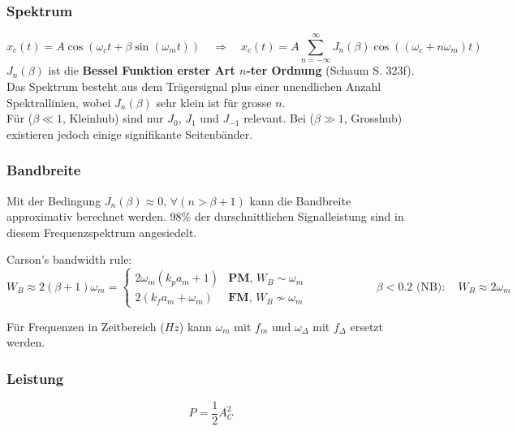 \subsubsection{Spektrum}
$$x_c(t) = A \cos(\omega_c t + \beta \sin(\omega_m t)) \quad \Rightarrow \quad 
x_c(t) = A \sum\limits_{n=-\infty}^{\infty} J_n(\beta) \cos((\omega_c + n \omega_m)t)$$
\textbf{$J_n(\beta)$} ist die \textbf{Bessel Funktion erster Art $n$-ter Ordnung} (Schaum
S. 323f). Das Spektrum besteht aus dem Trägersignal plus einer unendlichen Anzahl Spektrallinien,
wobei $J_n(\beta)$ sehr klein ist für grosse $n$. \\
Für ($\beta \ll 1$, Kleinhub) sind nur $J_0$, $J_1$ und $ J_{-1}$ relevant. Bei ($\beta \gg 1$,
Grosshub) existieren jedoch einige signifikante Seitenbänder.

\subsubsection{Bandbreite}
Mit der Bedingung $J_n(\beta) \approx 0, \,\forall (n > \beta + 1)$ kann die Bandbreite approximativ
berechnet werden. 98\% der durschnittlichen Signalleistung sind in diesem
Frequenzspektrum angesiedelt. 

\begin{center}
Carson's bandwidth rule: $ W_B \approx 2(\beta + 1) \omega_m = 
	\begin{cases}
  		2 \omega_m (k_p a_m + 1) & \textbf{PM},\, W_B \sim \omega_m \\
  		2(k_f a_m + \omega_m) & \textbf{FM},\, W_B \nsim \omega_m \end{cases} \qquad
  		\qquad \qquad \beta < 0.2 \text{ (NB)}: \quad W_{B} \approx 2 \omega_m
$
\end{center}
F\"ur Frequenzen in Zeitbereich ($Hz$) kann $\omega_m$ mit $f_m$ und
$\omega_{\Delta}$ mit $f_{\Delta}$ ersetzt werden.\\
\subsubsection{Leistung }
$$P = \frac12 A_C^2$$



